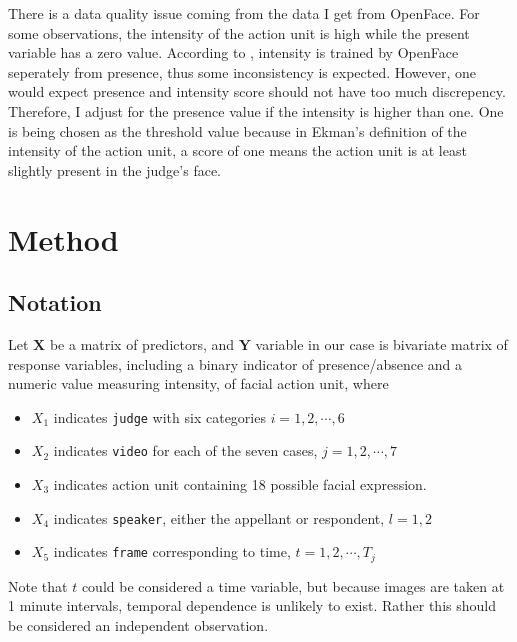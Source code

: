\documentclass{monashthesis}
\begin{document}
There is a data quality issue coming from the data I get from OpenFace. For some observations, the intensity of the action unit is high while the present variable has a zero value. According to \textcite{baltrusaitis2018openface}, intensity is trained by OpenFace seperately from presence, thus some inconsistency is expected. However, one would expect presence and intensity score should not have too much discrepency. Therefore, I adjust for the presence value if the intensity is higher than one. One is being chosen as the threshold value because in Ekman's definition of the intensity of the action unit, a score of one means the action unit is at least slightly present in the judge's face.

\hypertarget{method}{%
\chapter{Method}\label{method}}

\hypertarget{notation}{%
\section{Notation}\label{notation}}

Let \(\mathbf{X}\) be a matrix of predictors, and \(\mathbf{Y}\) variable in our case is bivariate matrix of response variables, including a binary indicator of presence/absence and a numeric value measuring intensity, of facial action unit, where

\begin{itemize}
\tightlist
\item
  \(X_1\) indicates \texttt{judge} with six categories \(i = 1,2, \cdots, 6\)
\item
  \(X_2\) indicates \texttt{video} for each of the seven cases, \(j = 1,2, \cdots, 7\)
\item
  \(X_3\) indicates action unit containing 18 possible facial expression.\\
\item
  \(X_4\) indicates \texttt{speaker}, either the appellant or respondent, \(l=1,2\)
\item
  \(X_5\) indicates \texttt{frame} corresponding to time, \(t = 1,2, \cdots, T_j\)
\end{itemize}

Note that \(t\) could be considered a time variable, but because images are taken at 1 minute intervals, temporal dependence is unlikely to exist. Rather this should be considered an independent observation.
\end{document}
